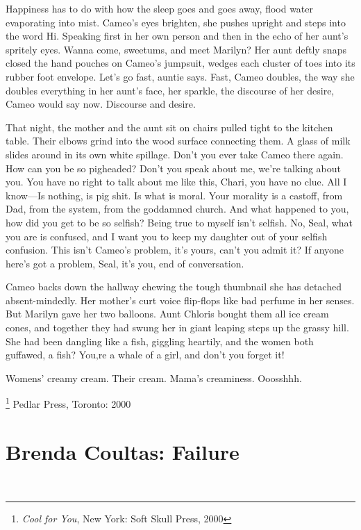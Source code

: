 \documentclass[
]{memoir}
\begin{document}
Happiness has to do with how the sleep goes and goes away, flood water
evaporating into mist. Cameo's eyes brighten, she pushes upright and
steps into the word Hi. Speaking first in her own person and then in the
echo of her aunt's spritely eyes. Wanna come, sweetums, and meet
Marilyn? Her aunt deftly snaps closed the hand pouches on Cameo's
jumpsuit, wedges each cluster of toes into its rubber foot envelope.
Let's go fast, auntie says. Fast, Cameo doubles, the way she doubles
everything in her aunt's face, her sparkle, the discourse of her desire,
Cameo would say now. Discourse and desire.

That night, the mother and the aunt sit on chairs pulled tight to the
kitchen table. Their elbows grind into the wood surface connecting them.
A glass of milk slides around in its own white spillage. Don't you ever
take Cameo there again. How can you be so pigheaded? Don't you speak
about me, we're talking about you. You have no right to talk about me
like this, Chari, you have no clue. All I know---Is nothing, is pig
shit. Is what is moral. Your morality is a castoff, from Dad, from the
system, from the goddamned church. And what happened to you, how did you
get to be so selfish? Being true to myself isn't selfish. No, Seal, what
you are is confused, and I want you to keep my daughter out of your
selfish confusion. This isn't Cameo's problem, it's yours, can't you
admit it? If anyone here's got a problem, Seal, it's you, end of
conversation.

Cameo backs down the hallway chewing the tough thumbnail she has
detached absent-mindedly. Her mother's curt voice flip-flops like bad
perfume in her senses. But Marilyn gave her two balloons. Aunt Chloris
bought them all ice cream cones, and together they had swung her in
giant leaping steps up the grassy hill. She had been dangling like a
fish, giggling heartily, and the women both guffawed, a fish? You‚re a
whale of a girl, and don't you forget it!

Womens' creamy cream. Their cream. Mama's creaminess. Ooosshhh.

\footnote{\emph{Cool for You}, New York: Soft Skull Press, 2000} Pedlar
Press, Toronto: 2000

\hypertarget{brenda-coultas-failure}{%
\chapter{Brenda Coultas: Failure}\label{brenda-coultas-failure}}

~
\end{document}
